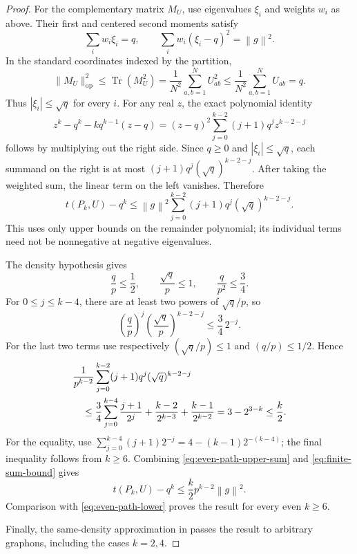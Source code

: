 \documentclass[11pt]{article}
\numberwithin{equation}{section}
\newcommand{\norm}[1]{\left\lVert #1\right\rVert}
\newcommand{\Tr}{\operatorname{Tr}}
\newcommand{\tP}[2]{t(P_{#1},#2)}
\begin{document}
\begin{proof}
  For the complementary matrix $M_U$, use eigenvalues $\xi_i$
  and weights $w_i$ as above. Their first and centered second
  moments satisfy
  \[
    \sum_iw_i\xi_i=q,\qquad
    \sum_iw_i(\xi_i-q)^2=\norm g^2.
  \]
  In the standard coordinates indexed by the partition,
  \[
    \|M_U\|_{\mathrm{op}}^2
      \le\Tr(M_U^2)
      =\frac1{N^2}\sum_{a,b=1}^N U_{ab}^2
      \le\frac1{N^2}\sum_{a,b=1}^N U_{ab}=q.
  \]
  Thus $|\xi_i|\le\sqrt q$ for every $i$. For any real $z$,
  the exact polynomial identity
  \begin{equation}\label{eq:power-remainder}
    z^k-q^k-kq^{k-1}(z-q)
      =(z-q)^2\sum_{j=0}^{k-2}(j+1)q^j z^{k-2-j}
  \end{equation}
  follows by multiplying out the right side. Since $q\ge0$
  and $|\xi_i|\le\sqrt q$, each summand on the right is at most
  $(j+1)q^j(\sqrt q)^{k-2-j}$. After taking the weighted sum,
  the linear term on the left vanishes. Therefore
  \begin{equation}\label{eq:even-path-upper-sum}
    \tP kU-q^k
      \le\norm g^2\sum_{j=0}^{k-2}
          (j+1)q^j(\sqrt q)^{k-2-j}.
  \end{equation}
  This uses only upper bounds on the remainder polynomial; its
  individual terms need not be nonnegative at negative eigenvalues.

  The density hypothesis gives
  \[
    \frac qp\le\frac12,\qquad
    \frac{\sqrt q}{p}\le1,\qquad
    \frac q{p^2}\le\frac34.
  \]
  For $0\le j\le k-4$, there are at least two powers of
  $\sqrt q/p$, so
  \[
    \left(\frac qp\right)^j
      \left(\frac{\sqrt q}{p}\right)^{k-2-j}
      \le\frac34\,2^{-j}.
  \]
  For the last two terms use respectively
  $(\sqrt q/p)\le1$ and $(q/p)\le1/2$. Hence
  \begin{align}
    &\frac1{p^{k-2}}\sum_{j=0}^{k-2}
         (j+1)q^j(\sqrt q)^{k-2-j}\notag\\
    &\quad\le
      \frac34\sum_{j=0}^{k-4}\frac{j+1}{2^j}
      +\frac{k-2}{2^{k-3}}+\frac{k-1}{2^{k-2}}
       =3-2^{3-k}\le\frac k2.
    \label{eq:finite-sum-bound}
  \end{align}
  For the equality, use
  $\sum_{j=0}^{k-4}(j+1)2^{-j}
    =4-(k-1)2^{-(k-4)}$; the final inequality follows from
  $k\ge6$. Combining \eqref{eq:even-path-upper-sum} and
  \eqref{eq:finite-sum-bound} gives
  \[
    \tP kU-q^k\le\frac k2p^{k-2}\norm g^2.
  \]
  Comparison with \eqref{eq:even-path-lower} proves the result
  for every even $k\ge6$.

  Finally, the same-density approximation in
   passes the result to arbitrary
  graphons, including the cases $k=2,4$.
\end{proof}
\end{document}
